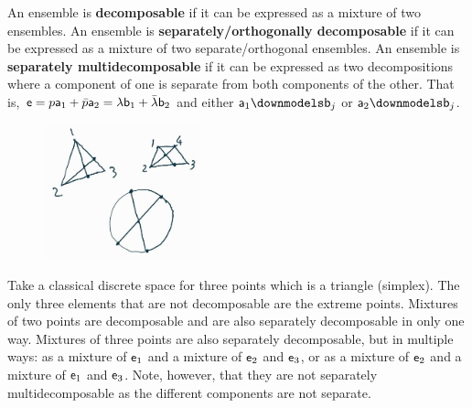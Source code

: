 
\begin{mathSection}
\begin{defn}
	An ensemble is \textbf{decomposable} if it can be expressed as a mixture of two ensembles. An ensemble is \textbf{separately/orthogonally decomposable} if it can be expressed as a mixture of two separate/orthogonal ensembles. An ensemble is \textbf{separately multidecomposable} if it can be expressed as two decompositions where a component of one is separate from both components of the other. That is, $\ens = p \ens[a]_1 + \bar{p} \ens[a]_2 = \lambda \ens[b]_1 +\bar{\lambda} \ens[b]_2$ and either $\ens[a]_1 \separate \ens[b]_j$ or $\ens[a]_2 \separate \ens[b]_j$.
\end{defn}

\begin{figure}[H]
	\centering
	\includegraphics[width=0.4\textwidth]{tempimages/MultipleDecomposition.jpg}
\end{figure}

\begin{remark}
	Take a classical discrete space for three points which is a triangle (simplex). The only three elements that are not decomposable are the extreme points. Mixtures of two points are decomposable and are also separately decomposable in only one way. Mixtures of three points are also separately decomposable, but in multiple ways: as a mixture of $\ens_1$ and a mixture of $\ens_2$ and $\ens_3$, or as a mixture of $\ens_2$ and a mixture of $\ens_1$ and $\ens_3$. Note, however, that they are not separately multidecomposable as the different components are not separate.
	

\end{remark}
\end{mathSection}

